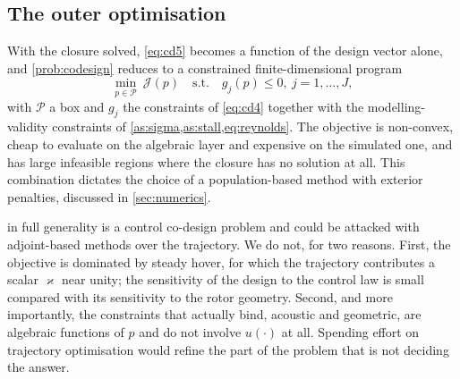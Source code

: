 \subsection{The outer optimisation}

With the closure solved, \cref{eq:cd5} becomes a function of the design vector
alone, and \cref{prob:codesign} reduces to a constrained finite-dimensional
program
\begin{equation}
  \min_{p\in\mathcal{P}} \ \mathcal{J}(p)
  \quad\text{s.t.}\quad
  g_j(p)\le0,\ j=1,\dots,J ,
  \label{eq:outerprog}
\end{equation}
with $\mathcal{P}$ a box and $g_j$ the constraints of \cref{eq:cd4} together
with the modelling-validity constraints of
\cref{as:sigma,as:stall,eq:reynolds}. The objective is non-convex, cheap to
evaluate on the algebraic layer and expensive on the simulated one, and has
large infeasible regions where the closure has no solution at all. This
combination dictates the choice of a population-based method with exterior
penalties, discussed in \cref{sec:numerics}.

\begin{remark}
 in full generality is a control co-design problem and
could be attacked with adjoint-based methods over the trajectory. We do not,
for two reasons. First, the objective is dominated by steady hover, for which
the trajectory contributes a scalar $\varkappa$ near unity; the sensitivity of
the design to the control law is small compared with its sensitivity to the
rotor geometry. Second, and more importantly, the constraints that actually
bind, acoustic and geometric, are algebraic functions of $p$ and do not involve
$u(\cdot)$ at all. Spending effort on trajectory optimisation would refine the
part of the problem that is not deciding the answer.
\end{remark}
